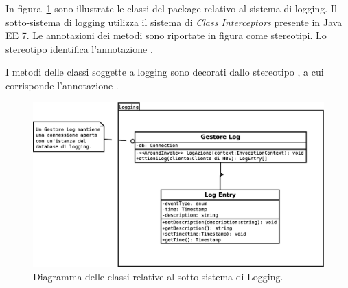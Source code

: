 In figura~\ref{fig:classi-principali:log} sono illustrate le classi del package relativo al sistema di logging.
Il sotto-sistema di logging utilizza il sistema di \emph{Class Interceptors} presente in Java EE 7.
Le annotazioni dei metodi sono riportate in figura come stereotipi.
Lo stereotipo  identifica l'annotazione .

I metodi delle classi soggette a logging sono decorati dallo stereotipo , a cui corrisponde l'annotazione .

\begin{figure}[h]
    \centering
    \includegraphics[width=\textwidth]{Images/dia/Logging.eps}
    \caption{Diagramma delle classi relative al sotto-sistema di Logging.}
    \label{fig:classi-principali:log}
\end{figure}

